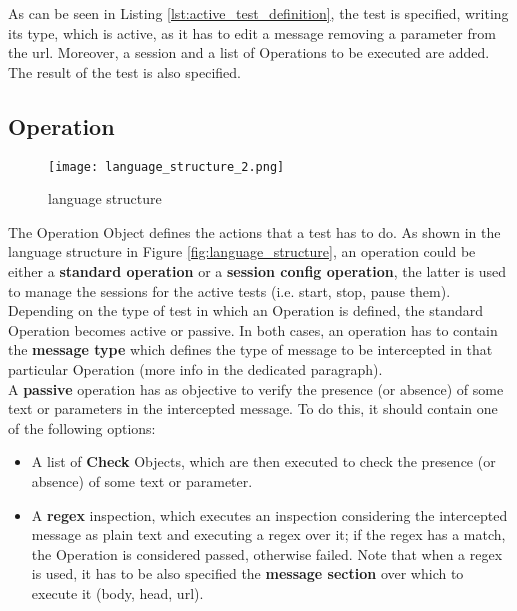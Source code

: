 As can be seen in Listing \ref{lst:active_test_definition}, the test is specified, writing its type, which is active, as it has to edit a message removing a parameter from the url. Moreover, a session and a list of Operations to be executed are added. The result of the test is also specified.

\subsection{Operation}
\label{sec:operation}
\begin{wrapfigure}{r}{0.4\textwidth}
    \texttt{[image: language\_structure\_2.png]}
    \caption{language structure}
    \label{fig:language_structure_2}
\end{wrapfigure}
The Operation Object defines the actions that a test has to do. As shown in the language structure in Figure \ref{fig:language_structure}, an operation could be either a \textbf{standard operation} or a \textbf{session config operation}, the latter is used to manage the sessions for the active tests (i.e. start, stop, pause them). Depending on the type of test in which an Operation is defined, the standard Operation becomes active or passive.
In both cases, an operation has to contain the \textbf{message type} which defines the type of message to be intercepted in that particular Operation (more info in the dedicated paragraph).
\\A \textbf{passive} operation has as objective to verify the presence (or absence) of some text or parameters in the intercepted message. To do this, it should contain one of the following options:
\begin{itemize}
    \item A list of \textbf{Check} Objects, which are then executed to check the presence (or absence) of some text or parameter.
    \item A \textbf{regex} inspection, which executes an inspection considering the intercepted message as plain text and executing a regex over it; if the regex has a match, the Operation is considered passed, otherwise failed. Note that when a regex is used, it has to be also specified the \textbf{message section} over which to execute it (body, head, url).
\end{itemize}



